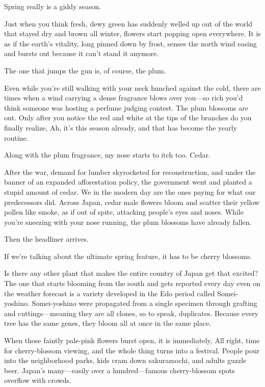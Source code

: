 \documentclass[
    a4paper,
    12pt,
    twoside,
    openany,
    UTF8,
    fontset=windows
]{ctexbook}
\begin{document}
Spring really is a giddy season.

Just when you think fresh, dewy green has suddenly welled up out of the world that stayed dry and brown all winter, flowers start popping open everywhere. It is as if the earth's vitality, long pinned down by frost, senses the north wind easing and bursts out because it can't stand it anymore.

The one that jumps the gun is, of course, the plum.

Even while you're still walking with your neck hunched against the cold, there are times when a wind carrying a dense fragrance blows over you---so rich you'd think someone was hosting a perfume judging contest. The plum blossoms are out. Only after you notice the red and white at the tips of the branches do you finally realize, Ah, it's this season already, and that has become the yearly routine.

Along with the plum fragrance, my nose starts to itch too. Cedar.

After the war, demand for lumber skyrocketed for reconstruction, and under the banner of an expanded afforestation policy, the government went and planted a stupid amount of cedar. We in the modern day are the ones paying for what our predecessors did. Across Japan, cedar male flowers bloom and scatter their yellow pollen like smoke, as if out of spite, attacking people's eyes and noses. While you're sneezing with your nose running, the plum blossoms have already fallen.

Then the headliner arrives.

If we're talking about the ultimate spring feature, it has to be cherry blossoms.

Is there any other plant that makes the entire country of Japan get that excited? The one that starts blooming from the south and gets reported every day even on the weather forecast is a variety developed in the Edo period called Somei-yoshino. Somei-yoshino were propagated from a single specimen through grafting and cuttings---meaning they are all clones, so to speak, duplicates. Because every tree has the same genes, they bloom all at once in the same place.

When those faintly pale-pink flowers burst open, it is immediately, All right, time for cherry-blossom viewing, and the whole thing turns into a festival. People pour into the neighborhood parks, kids cram down sakuramochi, and adults guzzle beer. Japan's many---easily over a hundred---famous cherry-blossom spots overflow with crowds.
\end{document}
